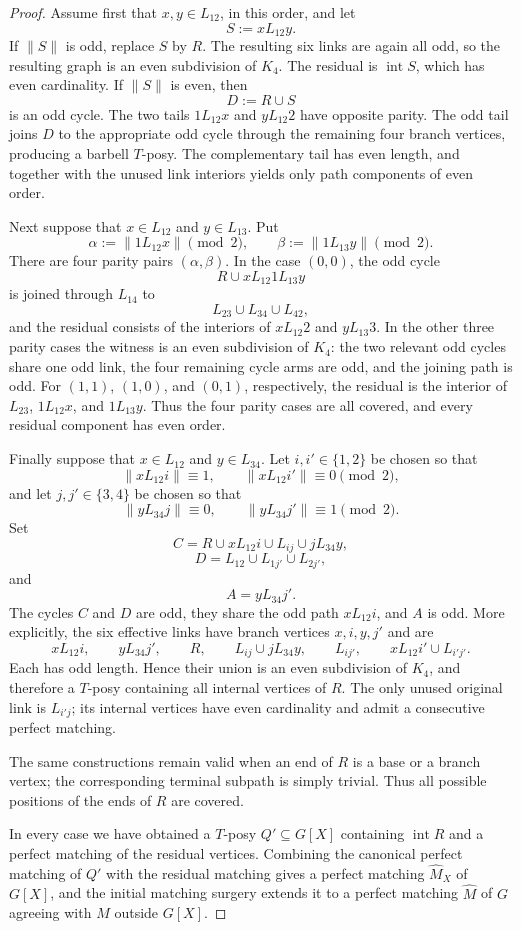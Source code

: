 \documentclass[preprint,12pt]{elsarticle}
\theoremstyle{plain}
\begin{document}
\begin{proof}
Assume first that \(x,y\in L_{12}\), in this order, and let
\[
S:=xL_{12}y.
\]
If \(\|S\|\) is odd, replace \(S\) by \(R\). The resulting six links
are again all odd, so the resulting graph is an even subdivision of
\(K_4\). The residual is \(\operatorname{int}S\), which has even
cardinality. If \(\|S\|\) is even, then
\[
D:=R\cup S
\]
is an odd cycle. The two tails \(1L_{12}x\) and \(yL_{12}2\) have
opposite parity. The odd tail joins \(D\) to the appropriate odd cycle
through the remaining four branch vertices, producing a barbell
\(T\)-posy. The complementary tail has even length, and together with
the unused link interiors yields only path components of even order.

Next suppose that \(x\in L_{12}\) and \(y\in L_{13}\). Put
\[
\alpha:=\|1L_{12}x\|\pmod2,
\qquad
\beta:=\|1L_{13}y\|\pmod2.
\]
There are four parity pairs \((\alpha,\beta)\). In the case
\((0,0)\), the odd cycle
\[
R\cup xL_{12}1L_{13}y
\]
is joined through \(L_{14}\) to
\[
L_{23}\cup L_{34}\cup L_{42},
\]
and the residual consists of the interiors of \(xL_{12}2\) and
\(yL_{13}3\). In the other three parity cases the witness is an even
subdivision of \(K_4\): the two relevant odd cycles share one odd link,
the four remaining cycle arms are odd, and the joining path is odd.
For \((1,1)\), \((1,0)\), and \((0,1)\), respectively, the residual is
the interior of \(L_{23}\), \(1L_{12}x\), and \(1L_{13}y\). Thus the
four parity cases are all covered, and every residual component has even
order.

Finally suppose that \(x\in L_{12}\) and \(y\in L_{34}\). Let
\(i,i'\in\{1,2\}\) be chosen so that
\[
\|xL_{12}i\|\equiv1,
\qquad
\|xL_{12}i'\|\equiv0
\pmod2,
\]
and let \(j,j'\in\{3,4\}\) be chosen so that
\[
\|yL_{34}j\|\equiv0,
\qquad
\|yL_{34}j'\|\equiv1
\pmod2.
\]
Set
\[
C=
R\cup xL_{12}i\cup L_{ij}\cup jL_{34}y,
\]
\[
D=
L_{12}\cup L_{1j'}\cup L_{2j'},
\]
and
\[
A=yL_{34}j'.
\]
The cycles \(C\) and \(D\) are odd, they share the odd path
\(xL_{12}i\), and \(A\) is odd. More explicitly, the six effective
links have branch vertices \(x,i,y,j'\) and are
\[
xL_{12}i,
\qquad
yL_{34}j',
\qquad
R,
\qquad
L_{ij}\cup jL_{34}y,
\qquad
L_{ij'},
\qquad
xL_{12}i'\cup L_{i'j'}.
\]
Each has odd length. Hence their union is an even subdivision of
\(K_4\), and therefore a \(T\)-posy containing all internal vertices
of \(R\). The only unused original link is \(L_{i'j}\); its internal
vertices have even cardinality and admit a consecutive perfect
matching.

The same constructions remain valid when an end of \(R\) is a base or
a branch vertex; the corresponding terminal subpath is simply trivial.
Thus all possible positions of the ends of \(R\) are covered.

In every case we have obtained a \(T\)-posy \(Q'\subseteq G[X]\)
containing \(\operatorname{int}R\) and a perfect matching of the
residual vertices. Combining the canonical perfect matching of \(Q'\)
with the residual matching gives a perfect matching
\(\widehat M_X\) of \(G[X]\), and the initial matching surgery extends
it to a perfect matching \(\widehat M\) of \(G\) agreeing with \(M\)
outside \(G[X]\).
\end{proof}
\end{document}
